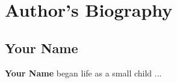 \chapter*{Author's Biography}

\section*{Your Name}

\textbf{Your Name} began life as a small child ...

